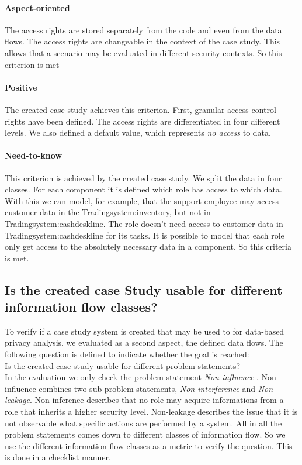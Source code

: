 \paragraph{Aspect-oriented}
The access rights are stored separately from the code and even from the data flows. The access rights are changeable in the context of the case study. This allows that a scenario may be evaluated in different security contexts. So this criterion is met
\paragraph{Positive}
The created case study achieves this criterion. First, granular access control rights have been defined. The access rights are differentiated in four different levels. We also defined a default value, which represents \textit{no access} to data.
\paragraph{Need-to-know}
This criterion is achieved by the created case study. We split the data in four classes. For each component it is defined which role has access to which data. With this we can model, for example, that the support employee may access customer data in the Tradingsystem:inventory, but not in Tradingsystem:cashdeskline. The role doesn't need access to customer data in Tradingsystem:cashdeskline for its tasks. It is possible to model that each role only get access to the absolutely necessary data in a component. So this criteria is met.
\subsection{Is the created case Study usable for different information flow classes?}
To verify if a case study system is created that may be used to for data-based privacy analysis, we evaluated as a second aspect, the defined data flows. The following question is defined to indicate whether the goal is reached:\\
Is the created case study usable for different problem statements?\\
In the evaluation we only check the problem statement \textit{Non-influence} \cite{Noninfluence}. Non-influence combines two sub problem statements, \textit{Non-interference} and \textit{Non-leakage}. Non-inference describes that no role may acquire informations from a role that inherits a higher security level. Non-leakage describes the issue that it is not observable what specific actions are performed by a system. All in all the problem statements comes down to different classes of information flow. So we use the different information flow classes as a metric to verify the question. This is done in a checklist manner. 
